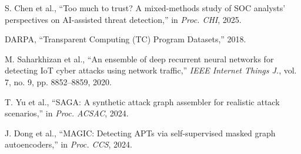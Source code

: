 \documentclass[conference]{IEEEtran}
\begin{document}
\begin{thebibliography}{99}
S. Chen et al., ``Too much to trust? A mixed-methods study of SOC analysts' perspectives on AI-assisted threat detection,'' in \emph{Proc. CHI}, 2025.

DARPA, ``Transparent Computing (TC) Program Datasets,'' 2018.

M. Saharkhizan et al., ``An ensemble of deep recurrent neural networks for detecting IoT cyber attacks using network traffic,'' \emph{IEEE Internet Things J.}, vol. 7, no. 9, pp. 8852--8859, 2020.

T. Yu et al., ``SAGA: A synthetic attack graph assembler for realistic attack scenarios,'' in \emph{Proc. ACSAC}, 2024.

J. Dong et al., ``MAGIC: Detecting APTs via self-supervised masked graph autoencoders,'' in \emph{Proc. CCS}, 2024.

\end{thebibliography}
\end{document}
